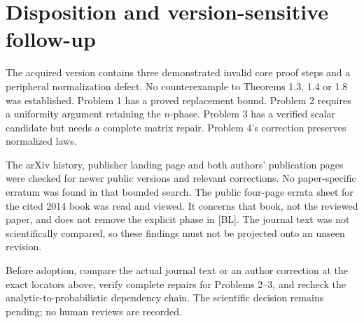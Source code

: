 \documentclass[10pt]{article}
\begin{document}
\section*{Disposition and version-sensitive follow-up}
The acquired version contains three demonstrated invalid core proof steps and a peripheral normalization defect. No counterexample to Theorems 1.3, 1.4 or 1.8 was established. Problem 1 has a proved replacement bound. Problem 2 requires a uniformity argument retaining the \(n\)-phase. Problem 3 has a verified scalar candidate but needs a complete matrix repair. Problem 4’s correction preserves normalized laws.\par
The arXiv history, publisher landing page and both authors’ publication pages were checked for newer public versions and relevant corrections. No paper-specific erratum was found in that bounded search. The public four-page errata sheet for the cited 2014 book was read and viewed. It concerns that book, not the reviewed paper, and does not remove the explicit phase in [BL]. The journal text was not scientifically compared, so these findings must not be projected onto an unseen revision.\par
Before adoption, compare the actual journal text or an author correction at the exact locators above, verify complete repairs for Problems 2–3, and recheck the analytic-to-probabilistic dependency chain. The scientific decision remains pending; no human reviews are recorded.\par
\end{document}
